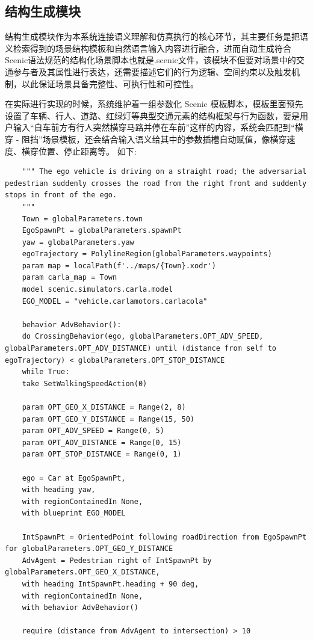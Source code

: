 \subsection{结构生成模块}

结构生成模块作为本系统连接语义理解和仿真执行的核心环节，其主要任务是把语义检索得到的场景结构模板和自然语言输入内容进行融合，进而自动生成符合Scenic语法规范的结构化场景脚本也就是.scenic文件，该模块不但要对场景中的交通参与者及其属性进行表达，还需要描述它们的行为逻辑、空间约束以及触发机制，以此保证场景具备完整性、可执行性和可控性。

在实际进行实现的时候，系统维护着一组参数化 Scenic 模板脚本，模板里面预先设置了车辆、行人、道路、红绿灯等典型交通元素的结构框架与行为函数，要是用户输入“自车前方有行人突然横穿马路并停在车前”这样的内容，系统会匹配到“横穿 - 阻挡”场景模板，还会结合输入语义给其中的参数插槽自动赋值，像横穿速度、横穿位置、停止距离等。
如下:
\begin{lstlisting}
	""" The ego vehicle is driving on a straight road; the adversarial pedestrian suddenly crosses the road from the right front and suddenly stops in front of the ego.
	"""
	Town = globalParameters.town
	EgoSpawnPt = globalParameters.spawnPt
	yaw = globalParameters.yaw
	egoTrajectory = PolylineRegion(globalParameters.waypoints)
	param map = localPath(f'../maps/{Town}.xodr') 
	param carla_map = Town
	model scenic.simulators.carla.model
	EGO_MODEL = "vehicle.carlamotors.carlacola"
	
	behavior AdvBehavior():
	do CrossingBehavior(ego, globalParameters.OPT_ADV_SPEED, globalParameters.OPT_ADV_DISTANCE) until (distance from self to egoTrajectory) < globalParameters.OPT_STOP_DISTANCE
	while True:
	take SetWalkingSpeedAction(0)
	
	param OPT_GEO_X_DISTANCE = Range(2, 8)
	param OPT_GEO_Y_DISTANCE = Range(15, 50)
	param OPT_ADV_SPEED = Range(0, 5)
	param OPT_ADV_DISTANCE = Range(0, 15)
	param OPT_STOP_DISTANCE = Range(0, 1)
	
	ego = Car at EgoSpawnPt,
	with heading yaw,
	with regionContainedIn None,
	with blueprint EGO_MODEL
	
	IntSpawnPt = OrientedPoint following roadDirection from EgoSpawnPt for globalParameters.OPT_GEO_Y_DISTANCE
	AdvAgent = Pedestrian right of IntSpawnPt by globalParameters.OPT_GEO_X_DISTANCE,
	with heading IntSpawnPt.heading + 90 deg,
	with regionContainedIn None,
	with behavior AdvBehavior()
	
	require (distance from AdvAgent to intersection) > 10
\end{lstlisting}



